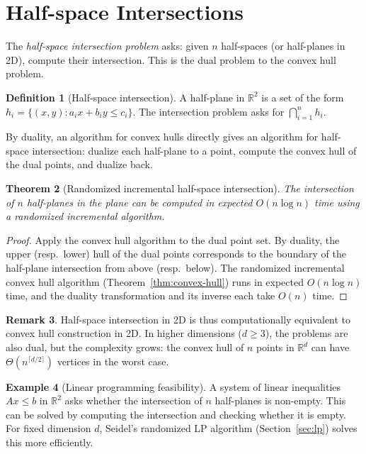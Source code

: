 \documentclass[twoside,12pt]{book}
\theoremstyle{plain}
\newtheorem{theorem}{Theorem}[chapter]
\theoremstyle{definition}
\newtheorem{definition}[theorem]{Definition}
\newtheorem{example}[theorem]{Example}
\newtheorem{remark}[theorem]{Remark}
\theoremstyle{remark}
\begin{document}
\section{Half-space Intersections}
\label{sec:halfspace}

The \emph{half-space intersection problem} asks: given $n$ half-spaces (or half-planes in 2D), compute their intersection. This is the dual problem to the convex hull problem.

\begin{definition}[Half-space intersection]
A half-plane in $\mathbb{R}^2$ is a set of the form $h_i = \{(x,y) : a_i x + b_i y \leq c_i\}$. The intersection problem asks for $\bigcap_{i=1}^{n} h_i$.
\end{definition}

By duality, an algorithm for convex hulls directly gives an algorithm for half-space intersection: dualize each half-plane to a point, compute the convex hull of the dual points, and dualize back.

\begin{theorem}[Randomized incremental half-space intersection]
\label{thm:halfspace}
The intersection of $n$ half-planes in the plane can be computed in expected $O(n \log n)$ time using a randomized incremental algorithm.
\end{theorem}

\begin{proof}
Apply the convex hull algorithm to the dual point set. By duality, the upper (resp.\ lower) hull of the dual points corresponds to the boundary of the half-plane intersection from above (resp.\ below). The randomized incremental convex hull algorithm (Theorem~\ref{thm:convex-hull}) runs in expected $O(n \log n)$ time, and the duality transformation and its inverse each take $O(n)$ time.
\end{proof}

\begin{remark}
Half-space intersection in 2D is thus computationally equivalent to convex hull construction in 2D. In higher dimensions ($d \geq 3$), the problems are also dual, but the complexity grows: the convex hull of $n$ points in $\mathbb{R}^d$ can have $\Theta(n^{\lceil d/2 \rceil})$ vertices in the worst case.
\end{remark}

\begin{example}[Linear programming feasibility]
A system of linear inequalities $Ax \leq b$ in $\mathbb{R}^2$ asks whether the intersection of $n$ half-planes is non-empty. This can be solved by computing the intersection and checking whether it is empty. For fixed dimension $d$, Seidel's randomized LP algorithm (Section~\ref{sec:lp}) solves this more efficiently.
\end{example}
\end{document}
